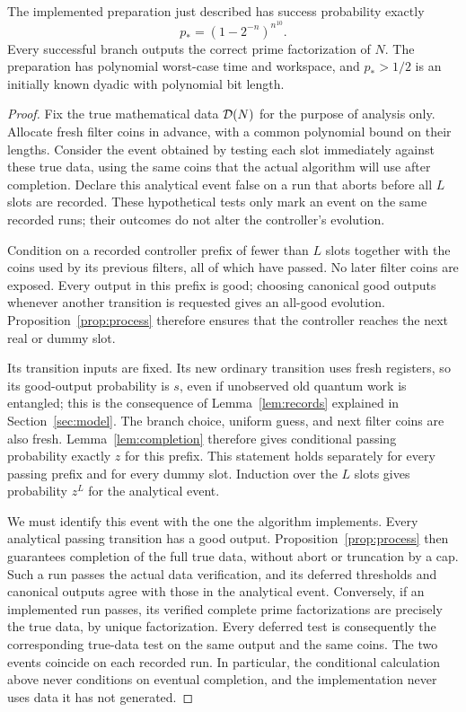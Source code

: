 \begin{proposition}\label{prop:known-probability}
The implemented preparation just described has success probability exactly
\begin{equation}\label{eq:p-star}
 p_*=(1-2^{-n})^{n^{10}}.
\end{equation}
Every successful branch outputs the correct prime factorization of $N$. The preparation has polynomial worst-case time and workspace, and $p_*>1/2$ is an initially known dyadic with polynomial bit length.
\end{proposition}
\begin{proof}
Fix the true mathematical data $\mathcal D(N)$ for the purpose of analysis only. Allocate fresh filter coins in advance, with a common polynomial bound on their lengths. Consider the event obtained by testing each slot immediately against these true data, using the same coins that the actual algorithm will use after completion. Declare this analytical event false on a run that aborts before all $L$ slots are recorded. These hypothetical tests only mark an event on the same recorded runs; their outcomes do not alter the controller's evolution.

Condition on a recorded controller prefix of fewer than $L$ slots together with the coins used by its previous filters, all of which have passed. No later filter coins are exposed. Every output in this prefix is good; choosing canonical good outputs whenever another transition is requested gives an all-good evolution. Proposition~\ref{prop:process} therefore ensures that the controller reaches the next real or dummy slot.

Its transition inputs are fixed. Its new ordinary transition uses fresh registers, so its good-output probability is $s$, even if unobserved old quantum work is entangled; this is the consequence of Lemma~\ref{lem:records} explained in Section~\ref{sec:model}. The branch choice, uniform guess, and next filter coins are also fresh. Lemma~\ref{lem:completion} therefore gives conditional passing probability exactly $z$ for this prefix. This statement holds separately for every passing prefix and for every dummy slot. Induction over the $L$ slots gives probability $z^L$ for the analytical event.

We must identify this event with the one the algorithm implements. Every analytical passing transition has a good output. Proposition~\ref{prop:process} then guarantees completion of the full true data, without abort or truncation by a cap. Such a run passes the actual data verification, and its deferred thresholds and canonical outputs agree with those in the analytical event. Conversely, if an implemented run passes, its verified complete prime factorizations are precisely the true data, by unique factorization. Every deferred test is consequently the corresponding true-data test on the same output and the same coins. The two events coincide on each recorded run. In particular, the conditional calculation above never conditions on eventual completion, and the implementation never uses data it has not generated.


\end{proof}
